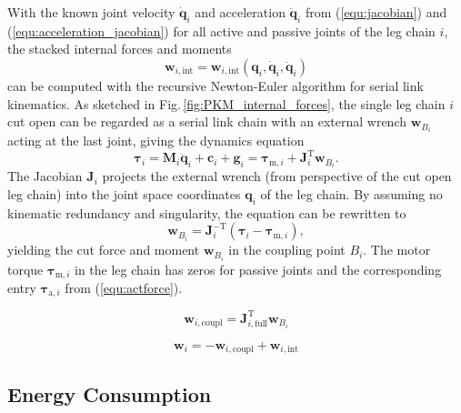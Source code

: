 \documentclass[fleqn,a4paper,10pt]{article}
\newcommand{\bm}[1]{\mathbf{#1}}
\newcommand{\transp}[0]{{\mathrm{T}}}
\begin{document}
\begin{multicols}{2}
With the known joint velocity $\dot{\bm{q}}_i$ and acceleration $\ddot{\bm{q}}_i$ from (\ref{equ:jacobian}) and (\ref{equ:acceleration_jacobian}) for all active and passive joints of the leg chain $i$, the stacked internal forces and moments
%
\begin{equation}
\bm{w}_{i,\mathrm{int}}=\bm{w}_{i,\mathrm{int}}(\bm{q}_i,\dot{\bm{q}}_i,\ddot{\bm{q}}_i)
\label{equ:intforce_leg}
\end{equation} %
%
can be computed with the recursive Newton-Euler algorithm for serial link kinematics.
As sketched in Fig.\,\ref{fig:PKM_internal_forces}, the single leg chain $i$ cut open can be regarded as a serial link chain with an external wrench $\bm{w}_{B_i}$ acting at the last joint, giving the dynamics equation
\begin{equation}
\bm{\tau}_i
=\bm{M}_i \ddot{\bm{q}}_i + \bm{c}_i + \bm{g}_i
=\bm{\tau}_{\mathrm{m},i} + \bm{J}_{i}^{\transp} \bm{w}_{B_i}.
\label{equ:invdyn_leg}
\end{equation}
%
The Jacobian $\bm{J}_{i}$ projects the external wrench (from perspective of the cut open leg chain) into the joint space coordinates $\bm{q}_i$ of the leg chain.
By assuming no kinematic redundancy and singularity, the equation can be rewritten to
%
\begin{equation}
\bm{w}_{B_i}=\bm{J}_{i}^{-\transp} (\bm{\tau}_i - \bm{\tau}_{\mathrm{m},i}),
\label{equ:coupling_wrench_leg}
\end{equation}
%
yielding the cut force and moment $\bm{w}_{B_i}$ in the coupling point $B_i$.
The motor torque $\bm{\tau}_{\mathrm{m},i}$ in the leg chain has zeros for passive joints and the corresponding entry $\bm{\tau}_{\mathrm{a},i}$ from (\ref{equ:actforce}).

\begin{equation}
\bm{w}_{i,\mathrm{coupl}}=\bm{J}_{i,\mathrm{full}}^{\transp} \bm{w}_{B_i}
\label{equ:intforce_fromcoupling}
\end{equation}


\begin{equation}
\bm{w}_{i} = -\bm{w}_{i,\mathrm{coupl}} + \bm{w}_{i,\mathrm{int}}
\label{equ:intforce_total}
\end{equation}

\subsection{Energy Consumption}
\label{sec:energy}


\end{multicols}
\end{document}
